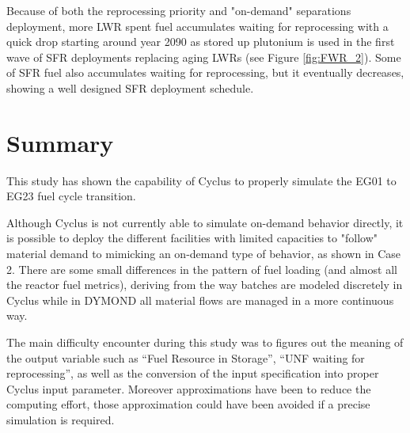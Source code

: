 \documentclass[12pt]{article}
\begin{document}
Because of both the reprocessing priority and "on-demand" separations
deployment, more LWR spent fuel accumulates waiting for reprocessing with a
quick drop starting around year 2090 as stored up plutonium is used in the first
wave of SFR deployments replacing aging LWRs (see Figure \ref{fig:FWR_2}). Some
of SFR fuel also accumulates waiting for reprocessing, but it eventually
decreases, showing a well designed SFR deployment schedule.

\section{Summary}

This study has shown the capability of Cyclus to properly simulate the EG01 to
EG23 fuel cycle transition.   

Although Cyclus is not currently able to simulate on-demand behavior directly,
it is possible to deploy the different facilities with limited capacities to
"follow" material demand to mimicking an on-demand type of behavior, as shown in
Case 2. There are some small differences in the pattern of fuel
loading (and almost all the reactor fuel metrics), deriving from the way
batches are modeled discretely in Cyclus while in DYMOND all 
material flows are managed in a more continuous way.

The main difficulty encounter during this study was to figures out the meaning
of the output variable such as ``Fuel Resource in Storage'', ``UNF waiting for
reprocessing'', as well as the conversion of the input specification into proper
Cyclus input parameter. Moreover approximations have been to reduce the
computing effort, those approximation could have been avoided if a precise
simulation is required.







\end{document}
